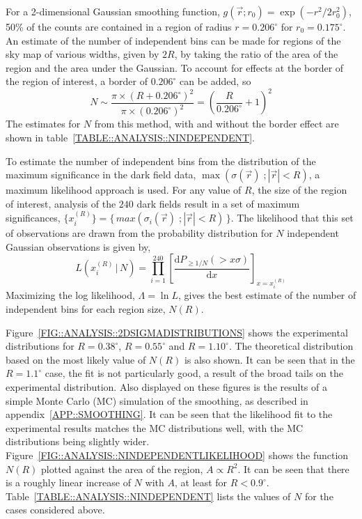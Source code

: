 For a 2-dimensional Gaussian smoothing function, $g(\vec{r};r_0)=
\exp(-r^2/2r_0^2)$, 50\% of the counts are contained in a region of
radius $r=0.206^\circ$ for $r_0=0.175^\circ$. An estimate of the number
of independent bins can be made for regions of the sky map of various
widths, given by $2R$, by taking the ratio of the area of the region
and the area under the Gaussian. To account for effects at the border
of the region of interest, a border of $0.206^\circ$ can be added, so
\[N \sim \frac{\pi\times(R+0.206^\circ)^2}{\pi\times(0.206^\circ)^2} =
\left(\frac{R}{0.206^\circ}+1\right)^2\]
The estimates for $N$ from this method, with and without the border
effect are shown in table~\ref{TABLE::ANALYSIS::NINDEPENDENT}.

To estimate the number of independent bins from the distribution of
the maximum significance in the dark field data,
\mbox{$\max(\sigma(\vec{r})\;;|\vec{r}|<R)$}, a maximum likelihood
approach is used. For any value of $R$, the size of the region of
interest, analysis of the $240$ dark fields result in a set of maximum
significances, $\{x^{(R)}_i\}=\{\,max(\sigma_i(\vec{r})\;;|\vec{r}|<R)\,\}$.
The likelihood that this set of observations are drawn from the 
probability distribution for $N$ independent Gaussian observations is
given by,
\[L(x^{(R)}_i\,|\,N) = \prod_{i=1}^{240}\left[\frac{\mathrm{d}P_{\geq
1/N}(>x\sigma)}{\mathrm{d}x}\right]_{x=x^{(R)}_i}\] Maximizing the log
likelihood, $\Lambda=\ln L$, gives the best estimate of the number of
independent bins for each region size, $N(R)$. 

Figure~\ref{FIG::ANALYSIS::2DSIGMADISTRIBUTIONS} shows the
experimental distributions for $R=0.38^\circ$, $R=0.55^\circ$ and
$R=1.10^\circ$. The theoretical distribution based on the most likely
value of $N(R)$ is also shown. It can be seen that in the
$R=1.1^\circ$ case, the fit is not particularly good, a result of the
broad tails on the experimental distribution. Also displayed on these
figures is the results of a simple Monte Carlo (MC) simulation of the
smoothing, as described in appendix~\ref{APP::SMOOTHING}. It can be
seen that the likelihood fit to the experimental results matches the
MC distributions well, with the MC distributions being slightly
wider. Figure~\ref{FIG::ANALYSIS::NINDEPENDENTLIKELIHOOD} shows the
function $N(R)$ plotted against the area of the region, $A\propto
R^2$. It can be seen that there is a roughly linear increase of $N$
with $A$, at least for
$R<0.9^\circ$. Table~\ref{TABLE::ANALYSIS::NINDEPENDENT} lists the
values of $N$ for the cases considered above.


